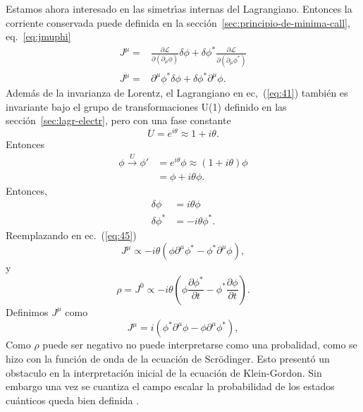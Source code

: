 Estamos ahora interesado en las simetr\'\i as internas del Lagrangiano. Entonces la corriente conservada puede definida en la secci\'on~\ref{sec:principio-de-minima-call}, eq.~\eqref{eq:jmuphi}
\begin{align}
  J^\mu=&\frac{\partial\mathcal{L}}{\partial(\partial_\mu\phi)}\delta\phi+\delta\phi^*\frac{\partial\mathcal{L}}{\partial(\partial_\mu\phi^*)}\nonumber\\
  \label{eq:45}
  J^\mu=&\partial^\mu\phi^*\delta\phi+\delta\phi^*\partial^\mu\phi.
\end{align}
Adem\'as de la invarianza de Lorentz, el Lagrangiano en ec,~(\ref{eq:41}) tambi\'en es invariante bajo el grupo de transformaciones U(1) definido en las secci\'on~\ref{sec:lagr-electr}, pero con una fase constante
\begin{equation*}
  U=e^{i\theta}\approx1+i\theta.
\end{equation*}
Entonces
\begin{align}
  \phi\overset{U}{\longrightarrow}\phi'&=e^{i\theta}\phi\approx(1+i\theta)\phi\nonumber\\
  &=\phi+i\theta\phi.
\end{align}
Entonces,
\begin{align}
  \delta\phi&=i\theta\phi\\
  \delta\phi^*&=-i\theta\phi^*.
\end{align}
Reemplazando en ec.~(\ref{eq:45})
\begin{equation}
\label{eq:46}
  J^\mu\propto -i\theta(\phi\partial^\mu\phi^*-\phi^*\partial^\mu\phi),
\end{equation}
y
\begin{equation}
\label{eq:47}
  \rho=J^0\propto-i\theta(\phi\frac{\partial\phi^*}{\partial t}-\phi^*\frac{\partial\phi}{\partial t}).
\end{equation}
Definimos $J^\mu$ como
\begin{equation}
  \label{eq:48}
   J^\mu= i(\phi^*\partial^\mu\phi-\phi\partial^\mu\phi^*),
\end{equation}
Como $\rho$ puede ser negativo no puede interpretarse como una
probalidad, como se hizo con la funci\'on de onda de la ecuaci\'on de
Scr\"odinger. Esto present\'o un obstaculo en la interpretaci\'on inicial de
la ecuaci\'on de Klein-Gordon. Sin embargo una vez se cuantiza el
campo escalar la probabilidad de los estados cu\'anticos queda bien
definida \cite{Gross}. 


